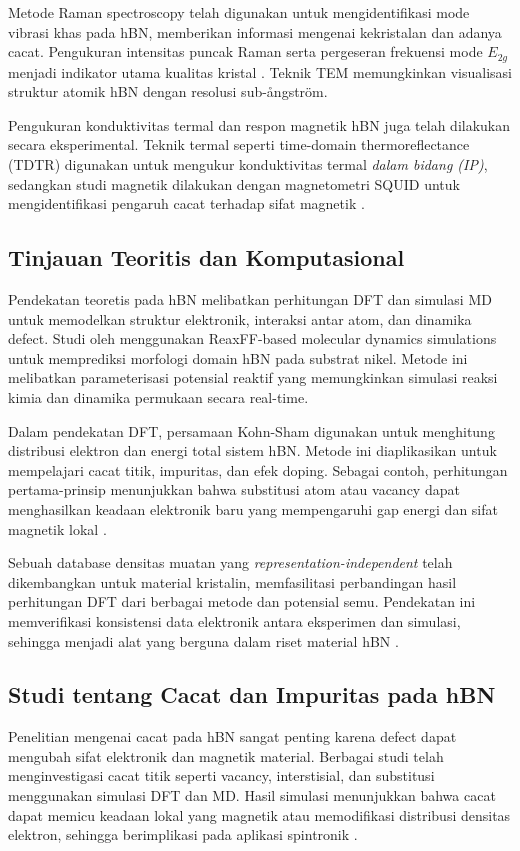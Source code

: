 Metode Raman spectroscopy telah digunakan untuk mengidentifikasi mode vibrasi khas pada hBN, memberikan informasi mengenai kekristalan dan adanya cacat. Pengukuran intensitas puncak Raman serta pergeseran frekuensi mode \(E_{2g}\) menjadi indikator utama kualitas kristal \citep{zhang_electrical_2016}. Teknik TEM memungkinkan visualisasi struktur atomik hBN dengan resolusi sub-ångström.
 
Pengukuran konduktivitas termal dan respon magnetik hBN juga telah dilakukan secara eksperimental. Teknik termal seperti time-domain thermoreflectance (TDTR) digunakan untuk mengukur konduktivitas termal \emph{dalam bidang (IP)}, sedangkan studi magnetik dilakukan dengan magnetometri SQUID untuk mengidentifikasi pengaruh cacat terhadap sifat magnetik \citep{zhang_point_2020}.

\subsection{Tinjauan Teoritis dan Komputasional}
Pendekatan teoretis pada hBN melibatkan perhitungan DFT dan simulasi MD untuk memodelkan struktur elektronik, interaksi antar atom, dan dinamika defect. Studi oleh \citep{wang_predicting_2018} menggunakan ReaxFF-based molecular dynamics simulations untuk memprediksi morfologi domain hBN pada substrat nikel. Metode ini melibatkan parameterisasi potensial reaktif yang memungkinkan simulasi reaksi kimia dan dinamika permukaan secara real-time.

Dalam pendekatan DFT, persamaan Kohn-Sham digunakan untuk menghitung distribusi elektron dan energi total sistem hBN. Metode ini diaplikasikan untuk mempelajari cacat titik, impuritas, dan efek doping. Sebagai contoh, perhitungan pertama-prinsip menunjukkan bahwa substitusi atom atau vacancy dapat menghasilkan keadaan elektronik baru yang mempengaruhi gap energi dan sifat magnetik lokal \citep{garcia_defect_2015}.
  
Sebuah database densitas muatan yang \emph{representation-independent} telah dikembangkan untuk material kristalin, memfasilitasi perbandingan hasil perhitungan DFT dari berbagai metode dan potensial semu. Pendekatan ini memverifikasi konsistensi data elektronik antara eksperimen dan simulasi, sehingga menjadi alat yang berguna dalam riset material hBN \citep{smith_representation-independent_2020}.

\subsection{Studi tentang Cacat dan Impuritas pada hBN}
Penelitian mengenai cacat pada hBN sangat penting karena defect dapat mengubah sifat elektronik dan magnetik material. Berbagai studi telah menginvestigasi cacat titik seperti vacancy, interstisial, dan substitusi menggunakan simulasi DFT dan MD. Hasil simulasi menunjukkan bahwa cacat dapat memicu keadaan lokal yang magnetik atau memodifikasi distribusi densitas elektron, sehingga berimplikasi pada aplikasi spintronik \citep{zhang_point_2020}.
 
